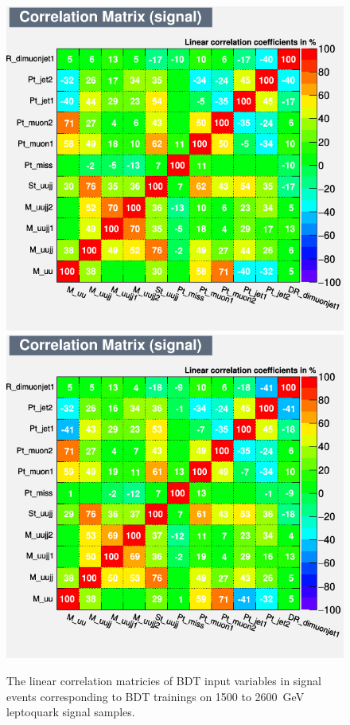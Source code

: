 \begin{figure}[H]
    {\includegraphics[width=.30\textwidth]{Images/Analysis/Results_LQToBMu_pair_uubj_BDTG_FullRun2_2023_01_25_020318/2500/CorrelationMatrixS.png}}
    {\includegraphics[width=.30\textwidth]{Images/Analysis/Results_LQToBMu_pair_uubj_BDTG_FullRun2_2023_01_25_020318/2600/CorrelationMatrixS.png}}
    \caption{The linear correlation matricies of BDT input variables in signal events corresponding to BDT trainings on 1500 to \SI{2600}{GeV} leptoquark signal samples.}
    \label{figapp:correlationsSig2}
\end{figure}

